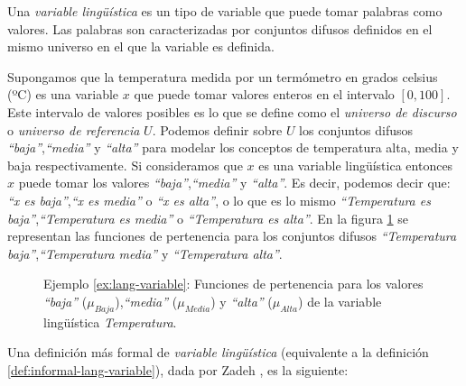 \begin{definition}\label{def:informal-lang-variable}
Una \emph{variable lingüística} es un tipo de variable que puede tomar palabras como valores. Las palabras son caracterizadas por conjuntos difusos definidos en el mismo universo en el que la variable es definida.
\end{definition}

\begin{example}\label{ex:lang-variable}
\normalfont
Supongamos que la temperatura medida por un termómetro en grados celsius (ºC) es una variable $x$ que puede tomar valores enteros en el intervalo $[0,100]$. Este intervalo de valores posibles es lo que se define como el \emph{universo de discurso} o \emph{universo de referencia} $U$. Podemos definir sobre $U$ los conjuntos difusos \emph{``baja''},\emph{``media''} y \emph{``alta''} para modelar los conceptos de temperatura alta, media y baja respectivamente. Si consideramos que $x$ es una variable lingüística entonces $x$ puede tomar los valores \emph{``baja''},\emph{``media''} y \emph{``alta''}. Es decir, podemos decir que: \emph{``x es baja''},\emph{``x es media''} o \emph{``x es alta''}, o lo que es lo mismo \emph{``Temperatura es baja''},\emph{``Temperatura es media''} o \emph{``Temperatura es alta''}. En la figura \ref{fig:example-temp-lang-variable} se representan las funciones de pertenencia para los conjuntos difusos \emph{``Temperatura baja''},\emph{``Temperatura media''} y \emph{``Temperatura alta''}.
\end{example}

\begin{figure}[t]
	\centering
	\setlength\figureheight{4.5cm}
	\setlength\figurewidth{12cm}
	
	\caption{Ejemplo \ref{ex:lang-variable}: Funciones de pertenencia para los valores \emph{``baja''} ($\mu_{Baja}$),\emph{``media''} ($\mu_{Media}$) y \emph{``alta''} ($\mu_{Alta}$) de la variable lingüística \emph{Temperatura}.}
	\label{fig:example-temp-lang-variable}
\end{figure}

Una definición más formal de \emph{variable lingüística} (equivalente a la definición \ref{def:informal-lang-variable}), dada por Zadeh \cite{Zadeh75}, es la siguiente:

